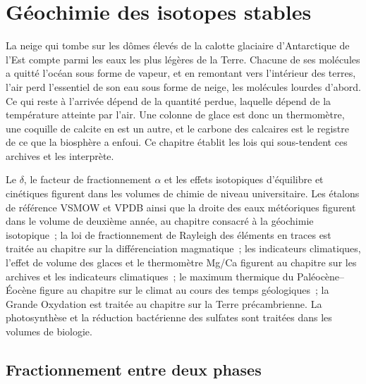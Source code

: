 \chapter{Géochimie des isotopes stables}\label{ch:b3:stable-isotopes}

La neige qui tombe sur les dômes élevés de la calotte glaciaire d'Antarctique de l'Est compte parmi
les eaux les plus légères de la Terre. Chacune de ses molécules a quitté l'océan sous forme de vapeur, et
en remontant vers l'intérieur des terres, l'air perd l'essentiel de son eau sous forme de neige, les molécules lourdes
d'abord. Ce qui reste à l'arrivée dépend de la quantité perdue, laquelle dépend de la température atteinte par l'air.
Une colonne de glace est donc un thermomètre, une coquille
de calcite en est un autre, et le carbone des calcaires est le registre de ce que la
biosphère a enfoui. Ce chapitre établit les lois qui sous-tendent ces archives et
les interprète.

\begin{recall}
Le $\delta$, le facteur de fractionnement $\alpha$ et les effets isotopiques d'équilibre et
cinétiques figurent dans les volumes de chimie de niveau universitaire. Les étalons de
référence VSMOW et VPDB ainsi que la droite des eaux météoriques figurent dans le volume de
deuxième année, au chapitre consacré à la géochimie isotopique~; la loi de fractionnement de Rayleigh
des éléments en traces est traitée au chapitre sur la différenciation magmatique~; les indicateurs
climatiques, l'effet de volume des glaces et le thermomètre Mg/Ca figurent au chapitre sur les archives
et les indicateurs climatiques~; le maximum thermique du Paléocène--Éocène figure au chapitre sur le
climat au cours des temps géologiques~; la Grande Oxydation est traitée au chapitre sur la Terre
précambrienne. La photosynthèse et la réduction bactérienne des sulfates sont traitées dans les volumes
de biologie.
\end{recall}

\section{Fractionnement entre deux phases}\label{sec:b3:stable-isotopes:fractionation}

